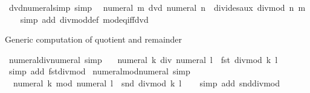 \begin{isabellebody}
\endisatagproof
{\isafoldproof}%
%
\isadelimproof
\isanewline
%
\endisadelimproof
\isanewline
{}\isamarkupfalse%
\ dvd{\isacharunderscore}{\kern0pt}numeral{\isacharunderscore}{\kern0pt}simp\ {\isacharbrackleft}{\kern0pt}simp{\isacharbrackright}{\kern0pt}{\isacharcolon}{\kern0pt}\isanewline
\ \ {\isachardoublequoteopen}numeral\ m\ dvd\ numeral\ n\ {\isasymlongleftrightarrow}\ divides{\isacharunderscore}{\kern0pt}aux\ {\isacharparenleft}{\kern0pt}divmod\ n\ m{\isacharparenright}{\kern0pt}{\isachardoublequoteclose}\isanewline
%
\isadelimproof
\ \ %
\endisadelimproof
%
\isatagproof
{}\isamarkupfalse%
\ {\isacharparenleft}{\kern0pt}simp\ add{\isacharcolon}{\kern0pt}\ divmod{\isacharunderscore}{\kern0pt}def\ mod{\isacharunderscore}{\kern0pt}eq{\isacharunderscore}{\kern0pt}{}{\isacharunderscore}{\kern0pt}iff{\isacharunderscore}{\kern0pt}dvd{\isacharparenright}{\kern0pt}%
\endisatagproof
{\isafoldproof}%
%
\isadelimproof
%
\endisadelimproof
%
\begin{isamarkuptext}%
Generic computation of quotient and remainder%
\end{isamarkuptext}\isamarkuptrue%
\isamarkupfalse%
\ numeral{\isacharunderscore}{\kern0pt}div{\isacharunderscore}{\kern0pt}numeral\ {\isacharbrackleft}{\kern0pt}simp{\isacharbrackright}{\kern0pt}{\isacharcolon}{\kern0pt}\ \isanewline
\ \ {\isachardoublequoteopen}numeral\ k\ div\ numeral\ l\ {\isacharequal}{\kern0pt}\ fst\ {\isacharparenleft}{\kern0pt}divmod\ k\ l{\isacharparenright}{\kern0pt}{\isachardoublequoteclose}\isanewline
%
\isadelimproof
\ \ %
\endisadelimproof
%
\isatagproof
{}\isamarkupfalse%
\ {\isacharparenleft}{\kern0pt}simp\ add{\isacharcolon}{\kern0pt}\ fst{\isacharunderscore}{\kern0pt}divmod{\isacharparenright}{\kern0pt}%
\endisatagproof
{\isafoldproof}%
%
\isadelimproof
\isanewline
%
\endisadelimproof
\isanewline
{}\isamarkupfalse%
\ numeral{\isacharunderscore}{\kern0pt}mod{\isacharunderscore}{\kern0pt}numeral\ {\isacharbrackleft}{\kern0pt}simp{\isacharbrackright}{\kern0pt}{\isacharcolon}{\kern0pt}\ \isanewline
\ \ {\isachardoublequoteopen}numeral\ k\ mod\ numeral\ l\ {\isacharequal}{\kern0pt}\ snd\ {\isacharparenleft}{\kern0pt}divmod\ k\ l{\isacharparenright}{\kern0pt}{\isachardoublequoteclose}\isanewline
%
\isadelimproof
\ \ %
\endisadelimproof
%
\isatagproof
{}\isamarkupfalse%
\ {\isacharparenleft}{\kern0pt}simp\ add{\isacharcolon}{\kern0pt}\ snd{\isacharunderscore}{\kern0pt}divmod{\isacharparenright}{\kern0pt}%
\endisatagproof
{\isafoldproof}%
%
\isadelimproof

\end{isabellebody}
